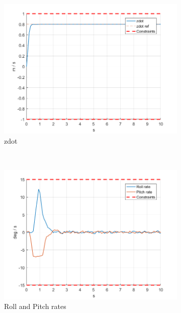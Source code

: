 \documentclass[11pt]{article}
\begin{document}
\begin{enumerate}
\begin{figure}[ht]
        \begin{subfigure}[c]{0.3\linewidth}
            \centering
            \includegraphics[width=\linewidth]{Plots_09_OffsetFreeTracking_Constant/04}
            \caption{zdot}
        \end{subfigure}
        ~
        \begin{subfigure}[c]{0.3\linewidth}
            \centering
            \includegraphics[width=\linewidth]{Plots_09_OffsetFreeTracking_Constant/05}
            \caption{Roll and Pitch rates}
        \end{subfigure}
        ~
        \begin{subfigure}[c]{0.3\linewidth}
            \centering

\end{subfigure}
\end{figure}
\end{enumerate}
\end{document}
